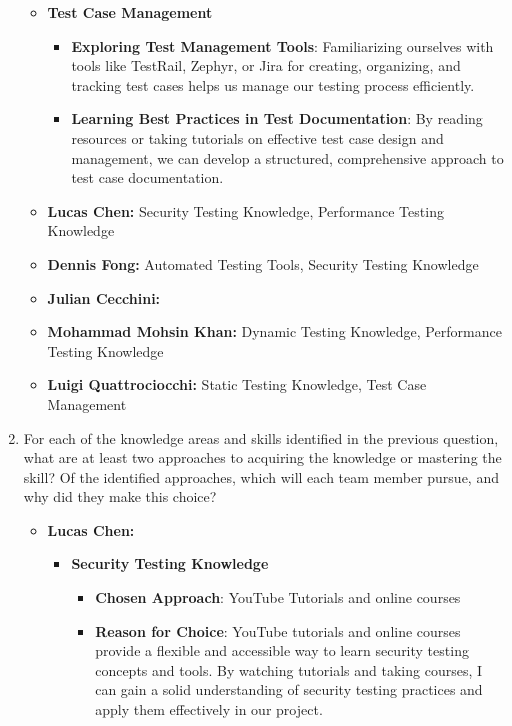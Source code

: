\documentclass[12pt, titlepage]{article}
\begin{document}
\begin{enumerate}
\begin{itemize}
    \item \textbf{Test Case Management}
    \begin{itemize}
        \item \textbf{Exploring Test Management Tools}: Familiarizing ourselves with tools like TestRail, Zephyr, or Jira for creating, organizing, and tracking test cases helps us manage our testing process efficiently.
        \item \textbf{Learning Best Practices in Test Documentation}: By reading resources or taking tutorials on effective test case design and management, we can develop a structured, comprehensive approach to test case documentation.
    \end{itemize}

  \end{itemize}

  \begin{itemize}
    \item \textbf{Lucas Chen:} Security Testing Knowledge, Performance Testing Knowledge
    \item \textbf{Dennis Fong:} Automated Testing Tools, Security Testing Knowledge
    \item \textbf{Julian Cecchini:} 
    \item \textbf{Mohammad Mohsin Khan:} Dynamic Testing Knowledge, Performance Testing Knowledge
    \item \textbf{Luigi Quattrociocchi:} Static Testing Knowledge, Test Case Management
  \end{itemize}


  \item For each of the knowledge areas and skills identified in the previous
  question, what are at least two approaches to acquiring the knowledge or
  mastering the skill?  Of the identified approaches, which will each team
  member pursue, and why did they make this choice?
  
  \begin{itemize}
    \item \textbf{Lucas Chen:} 
    \begin{itemize}
        \item \textbf{Security Testing Knowledge}  
        \begin{itemize}
            \item \textbf{Chosen Approach}: YouTube Tutorials and online courses
            \item \textbf{Reason for Choice}: YouTube tutorials and online courses provide a flexible and 
            accessible way to learn security testing concepts and tools. By watching tutorials and taking courses, 
            I can gain a solid understanding of security testing practices and apply them effectively in our project.
        \end{itemize}
    

\end{itemize}
\end{itemize}
\end{enumerate}
\end{document}
